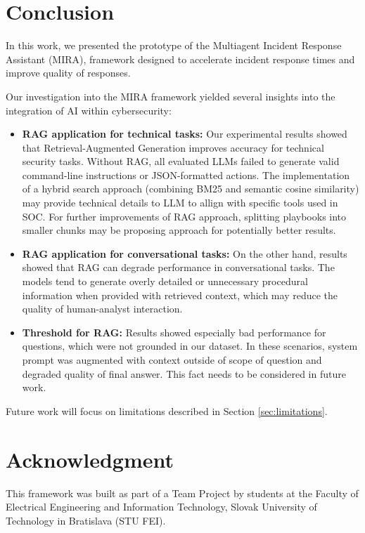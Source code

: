 \documentclass[conference]{IEEEtran}
\begin{document}
\section{Conclusion}\label{sec:conclusion}

In this work, we presented the prototype of the Multiagent Incident Response Assistant (MIRA), framework designed to accelerate incident response times and improve quality of responses. 

Our investigation into the MIRA framework yielded several insights into the integration of AI within cybersecurity:
\begin{itemize}
    \item \textbf{RAG application for technical tasks:} Our experimental results showed that Retrieval-Augmented Generation improves accuracy for technical security tasks.
    Without RAG, all evaluated LLMs failed to generate valid command-line instructions or JSON-formatted actions. 
    The implementation of a hybrid search approach (combining BM25 and semantic cosine similarity) may provide technical details to LLM to allign with specific tools used in SOC. 
    For further improvements of RAG approach, splitting playbooks into smaller chunks may be proposing approach for potentially better results.
    \item \textbf{RAG application for conversational tasks:} On the other hand, results showed that RAG can degrade performance in conversational tasks. 
    The models tend to generate overly detailed or unnecessary procedural information when provided with retrieved context, 
    which may reduce the quality of human-analyst interaction.
    \item \textbf{Threshold for RAG:} Results showed especially bad performance for questions, which were not grounded in our dataset. 
    In these scenarios, system prompt was augmented with context outside of scope of question and degraded quality of final answer. 
    This fact needs to be considered in future work. 
\end{itemize}

Future work will focus on limitations described in Section \ref{sec:limitations}.

\section*{Acknowledgment}
This framework was built as part of a Team Project by students at the Faculty of Electrical Engineering and Information Technology, Slovak University of Technology in Bratislava (STU FEI).
\end{document}
